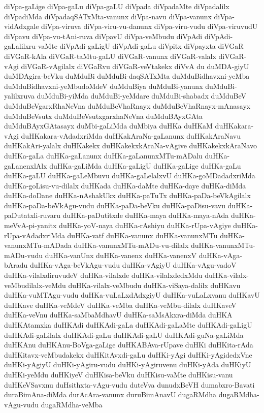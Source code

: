 {diVpa-gaLige
diVpa-gaLu
diVpa-gaLU
diVpada
diVpadaMte
diVpadalilx
diVpadiMda
diVpadaqSATxMta-vanunx
diVpa-navu
diVpa-vanunx
diVpa-vidAdxgale
diVpa-viruva
diVpa-viru-vu-danunx
diVpa-viru-vudu
diVpa-viruvudU
diVpavu
diVpa-vu-tAni-ruva
diVpavU
diVpa-veMbudu
diVpAdi
diVpAdi-gaLalilxru-vaMte
diVpAdi-gaLigU
diVpAdi-gaLu
diVpitx
diVpayxta
diVGaR
diVGaR-kAla
diVGaR-taMtu-gaLU
diVGaR-vanunx
diVGaR-valalx
diVGaR-vAgi
diVGaR-vAgilalx
diVGaRvu
diVGaR-veVtakekx
diVvA
du
duMDA-giyU
duMDAgira-beVku
duMduBi
duMduBi-daqSATxMta
duMduBidhavxni-yeMba
duMduBidhavxni-yeMbudoMdeV
duMduBiya
duMduBi-yanunx
duMduBi-yalilxruva
duMduBi-yiMda
duMduBi-yeMdare
duMduBi-shabadx
duMduBeV
duMduBeVgarxRhaNeVna
duMduBeVhaRnayx
duMduBeVhaRnayx-mAnasayx
duMduBeVsutx
duMduBeVsutxgarxhaNeVna
duMduBAyxGAta
duMduBAyxGAtasayx
duMbi-gaLiMda
duMbiya
duHKa
duHKaM
duHKakara-vAgi
duHKakara-vAdadxriMda
duHKakAraNa-gaLanunx
duHKakAraNavu
duHKakAri-yalalx
duHKakekx
duHKakekxkAraNa-vAgive
duHKakekxkAraNavo
duHKa-gaLa
duHKa-gaLanunx
duHKa-gaLanunxMTu-mADalu
duHKa-gaLanenxlAlx
duHKa-gaLiMda
duHKa-gaLigU
duHKa-gaLige
duHKa-gaLu
duHKa-gaLU
duHKa-gaLeMbuvu
duHKa-gaLelalxvU
duHKa-goMDadadxriMda
duHKa-goLisu-vu-dilalx
duHKada
duHKa-daMte
duHKa-daye
duHKa-diMda
duHKa-doDane
duHKa-nAshakUkx
duHKa-paTuTx
duHKa-paDa-beVkAgilalx
duHKa-paDa-beVkAgu-vudu
duHKa-paDa-beVku
duHKa-paDisu-vavu
duHKa-paDutatxli-ruvaru
duHKa-paDutitxde
duHKa-maya
duHKa-maya-nAda
duHKa-meVvA-pi-yanitx
duHKa-yoV-naya
duHKa-rAshiyu
duHKa-rUpa-vAgiye
duHKa-rUpa-vAdadxriMda
duHKa-vatf
duHKa-vanunx
duHKa-vanunxMTu
duHKa-vanunxMTu-mADada
duHKa-vanunxMTu-mADu-vu-dilalx
duHKa-vanunxMTu-mADu-vudu
duHKa-vanUnx
duHKa-vanenx
duHKa-vanenxV
duHKa-vAga-bAradu
duHKa-vAga-beVkAgu-vudu
duHKa-vAgiyU
duHKa-vAgu-vadoV
duHKa-vilalxdiruvudeV
duHKa-vilalxde
duHKa-vilalxdedxMdu
duHKa-vilalx-veMbudilalx-veMdu
duHKa-vilalx-veMbudu
duHKa-viSaya-dalilx
duHKavu
duHKa-vuMTAgu-vudu
duHKa-vuLaLxdAdxgiyU
duHKa-vuLaLxvanu
duHKavU
duHKave
duHKa-veMdeV
duHKa-veMba
duHKa-veMbu-dilalx
duHKaveV
duHKa-veVnu
duHKa-saMbaMdhavU
duHKa-saMsAkxra-diMda
duHKA
duHKAtamxka
duHKAdi
duHKAdi-gaLa
duHKAdi-gaLaMte
duHKAdi-gaLigU
duHKAdi-gaLilalx
duHKAdi-gaLu
duHKAdi-gaLU
duHKAdi-guNa-gaLiMda
duHKAnu
duHKAnu-BoVga-gaLige
duHKABAva-rUpave
duHKi
duHKita-rAda
duHKitavx-veMbudakekx
duHKitAvxdi-gaLu
duHKi-yAgi
duHKi-yAgidedxVne
duHKi-yAgiyU
duHKi-yAgiru-vudu
duHKi-yAgiruvenu
duHKi-yAda
duHKiyU
duHKi-yeMdu
duHKiyeV
duHKisa-beVku
duHKisu-vaMte
duHKisu-vanu
duHKeVSavxnu
duHsithxta-vAgu-vudu
duteVva
dunudxBeVH
dumabxro-Bavati
duraBimAna-diMda
durAcAra-vanunx
duruBimAnavU
dugaRMdha
dugaRMdha-vAgu-vudu
dugaRMdha-veMba
}
